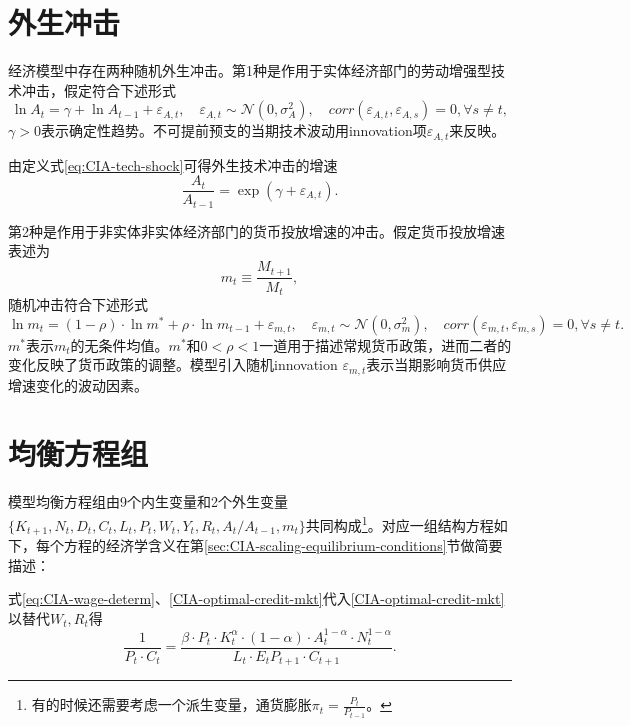\section{外生冲击}
\label{sec:CIA-exo-shocks}
经济模型中存在两种随机外生冲击。第1种是作用于实体经济部门的劳动增强型技术冲击，假定符合下述形式
\begin{equation}
  \label{eq:CIA-tech-shock}
  \ln A_t = \gamma + \ln A_{t-1} + \varepsilon_{A,t}, \quad \varepsilon_{A,t} \sim \mathcal{N}(0,\sigma_A^2), \quad corr(\varepsilon_{A,t}, \varepsilon_{A,s})=0, \forall s \neq t,
\end{equation}
$\gamma > 0$表示确定性趋势。不可提前预支的当期技术波动用innovation项$\varepsilon_{A,t}$来反映。

由定义式\eqref{eq:CIA-tech-shock}可得外生技术冲击的增速
\begin{equation}
  \label{eq:CIA-tech-shock-growth}
  \frac{A_t}{A_{t-1}} = \exp (\gamma + \varepsilon_{A,t}).
\end{equation}

第2种是作用于非实体非实体经济部门的货币投放增速的冲击。假定货币投放增速表述为
\begin{equation}
  \label{eq:CIA-money-injection-growth-def}
  m_t \equiv \frac{M_{t+1}}{M_t},
\end{equation}
随机冲击符合下述形式
\begin{equation}
  \label{eq:CIA-money-shock}
  \ln m_t = (1-\rho) \cdot \ln m^{*} + \rho \cdot \ln m_{t-1} + \varepsilon_{m,t}, \quad \varepsilon_{m,t} \sim \mathcal{N}(0,\sigma_m^2),  \quad corr(\varepsilon_{m,t}, \varepsilon_{m,s})=0, \forall s \neq t.
\end{equation}
$m^{*}$表示$m_t$的无条件均值。$m^{*}$和$0<\rho<1$一道用于描述常规货币政策，进而二者的变化反映了货币政策的调整。模型引入随机innovation $\varepsilon_{m,t}$表示当期影响货币供应增速变化的波动因素\citep{Sims:1982ks}。

\section{均衡方程组}
\label{sec:CIA-equilibrium-conditions}
模型均衡方程组由9个内生变量和2个外生变量$\{K_{t+1}, N_t, D_t, C_t, L_t, P_t, W_t, Y_t, R_t, A_t/A_{t-1}, m_t\}$共同构成\footnote{有的时候还需要考虑一个派生变量，通货膨胀$\pi_t = \frac{P_t}{P_{t-1}}$。}。对应一组结构方程如下，每个方程的经济学含义在第\ref{sec:CIA-scaling-equilibrium-conditions}节做简要描述：

式\eqref{eq:CIA-wage-determ}、\eqref{CIA-optimal-credit-mkt}代入\eqref{CIA-optimal-credit-mkt}以替代$W_t,R_t$得
  \begin{equation}
    \label{eq:CIA-equil-cond-unscal-inter-euler}
    \frac{1}{P_t \cdot C_t} = \frac{\beta \cdot P_t \cdot K_t^{\alpha} \cdot (1-\alpha) \cdot A_{t}^{1-\alpha} \cdot N_t^{1-\alpha}}{L_t \cdot E_t P_{t+1} \cdot C_{t+1}}.
  \end{equation}

